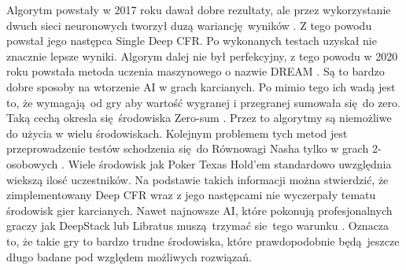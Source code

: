 \documentclass[12pt,oneside,a4paper]{report}
\begin{document}
Algorytm powstały w 2017 roku dawał dobre rezultaty, ale przez wykorzystanie dwuch sieci neuronowych
tworzył duzą wariancję wyników \cite{SD-CFR}. Z tego powodu powstał jego następca Single Deep CFR.
Po wykonanych testach uzyskał nie znacznie lepsze wyniki. Algorym dalej nie był perfekcyjny, z tego
powodu w 2020 roku powstała metoda uczenia maszynowego o nazwie DREAM \cite{DREAM}. Są to bardzo
dobre sposoby na wtorzenie AI w grach karcianych. Po mimio tego ich wadą jest to, że wymagają od gry
aby wartość wygranej i przegranej sumowała się do zero. Taką cechą okresla się środowiska Zero-sum
\cite{gt}. Przez to algorytmy są niemożliwe do użycia w wielu środowiskach.  
Kolejnym problemem tych
metod jest przeprowadzenie testów schodzenia się do Równowagi Nasha tylko w grach 2-osobowych \cite{DCFR}.
Wiele środowisk jak Poker Texas Hold'em standardowo uwzględnia wiekszą ilosć uczestników. Na
podstawie takich informacji można stwierdzić, że zimplementowany Deep CFR wraz z jego następcami nie
wyczerpały tematu środowisk gier karcianych. Nawet najnowsze AI, które pokonują profesjonalnych
graczy jak DeepStack lub Libratus muszą trzymać sie tego warunku \cite{libratus} \cite{ds}. 
Oznacza to, że takie gry to bardzo trudne środowiska, które prawdopodobnie będą jeszcze
długo badane pod względem możliwych rozwiązań.
\end{document}
